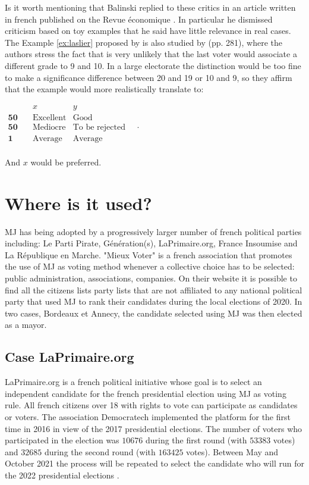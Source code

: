 Is it worth mentioning that Balinski replied to these critics in an article written in french published on the Revue économique \citep{Balinski2019}. In particular he dismissed criticism based on toy examples that he said have little relevance in real cases. The Example \ref{ex:laslier} proposed by \citet{Laslier2018} is also studied by \citet{Balinski2011} (pp. 281), where the authors stress the fact that is very unlikely that the last voter would associate a different grade to 9 and 10. In a large electorate the distinction would be too fine to make a significance difference between 20 and 19 or 10 and 9, so they affirm that the example would more realistically translate to: 
\begin{center}
	$
	\begin{array}{ccc}
		& x & y \\
		\mathbf{50} \quad &\text{Excellent}&\text{Good}\\
		\mathbf{50} \quad &\text{Mediocre}&\text{To be rejected}\\
		\mathbf{1} \quad &\text{Average}&\text{Average}\\
	\end{array}\quad .
	$
\end{center}
And $x$ would be preferred.

\section{Where is it used?}
\ac{MJ} has being adopted by a progressively larger number of french political parties including: Le Parti Pirate, Génération(s), LaPrimaire.org, France Insoumise and La République en Marche.
"Mieux Voter" \citep{MV} is a french association that promotes the use of \ac{MJ} as voting method whenever a collective choice has to be selected: public administration, associations, companies. On their website it is possible to find all the citizens lists \textendash party lists that are not affiliated to any national political party \textemdash that used \ac{MJ} to rank their candidates during the local elections of 2020. In two cases, Bordeaux et Annecy, the candidate selected using \ac{MJ} was then elected as a mayor. 


\subsection{Case LaPrimaire.org}
LaPrimaire.org \citep{LaPrimaire} is a french political initiative whose goal is to select an independent candidate for the french presidential election using \ac{MJ} as voting rule. All french citizens over 18 with rights to vote can participate as candidates or voters. The association Democratech implemented the platform for the first time in 2016 in view of the 2017 presidential elections. The number of voters who participated in the election was $10676$ during the first round (with $53383$ votes) and $32685$ during the second round (with $163425$ votes). Between May and October 2021 the process will be repeated to select the candidate who will run for the 2022 presidential elections \citep{LaPrimaire2022}.

